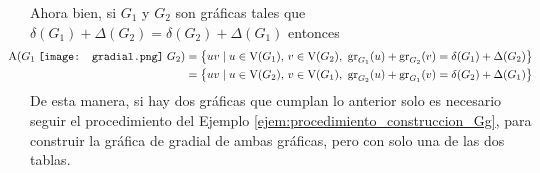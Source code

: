 \documentclass[fleqn, 11pt]{beamer}
\newcommand{\gradial}{\hspace{0.9mm} \texttt{[image: gradial.png]} \hspace{1mm}}
\begin{document}
    Ahora bien, si $ G_1 $ y $ G_2 $ son gráficas tales que $ \delta(G_1) + \Delta(G_2) = \delta(G_2) + \Delta(G_1) $ entonces 
    \begin{align*}
        \hspace{-7mm} \textnormal{A}(G_1 \gradial G_2) &= \bigl\{ uv \mid u \in \textnormal{V}(G_1), \, v \in \textnormal{V}(G_2), \textnormal{ gr}_{G_1}(u) + \textnormal{gr}_{G_2}(v) = \delta(G_1) + \Delta(G_2) \bigr\} \\
        &= \bigl\{ uv \mid u \in \textnormal{V}(G_2), \, v \in \textnormal{V}(G_1), \textnormal{ gr}_{G_2}(u) + \textnormal{gr}_{G_1}(v) = \delta(G_2) + \Delta(G_1) \bigr\}
    \end{align*}
    De esta manera, si hay dos gráficas que cumplan lo anterior solo es necesario seguir el procedimiento del Ejemplo \eqref{ejem:procedimiento_construccion_Gg}, para construir la gráfica de gradial de ambas gráficas, pero con solo una de las dos tablas.
\end{document}
